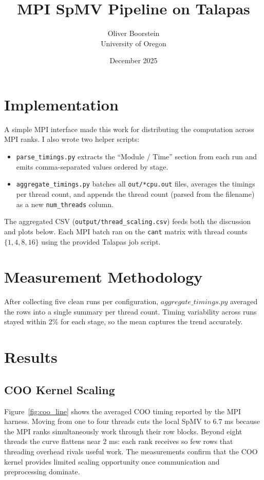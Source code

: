 \documentclass[11pt]{article}
\title{MPI SpMV Pipeline on Talapas}
\author{Oliver Boorstein \\ University of Oregon}
\date{December 2025}
\begin{document}
\twocolumn[
  \maketitle
  \vspace{-1em}
]

\section{Implementation}
A simple MPI interface made this work for distributing the computation across MPI ranks. I also wrote two helper scripts:
\begin{itemize}[leftmargin=*]
  \item \texttt{parse\_timings.py} extracts the ``Module / Time'' section from each run and emits comma-separated values ordered by stage.
  \item \texttt{aggregate\_timings.py} batches all \texttt{out/*cpu.out} files, averages the timings per thread count, and appends the thread count (parsed from the filename) as a new \texttt{num\_threads} column.
\end{itemize}
The aggregated CSV (\texttt{output/thread\_scaling.csv}) feeds both the discussion and plots below. Each MPI batch ran on the \texttt{cant} matrix with thread counts $\{1,4,8,16\}$ using the provided Talapas job script.

\section{Measurement Methodology}
After collecting five clean runs per configuration, $aggregate\_timings.py$ averaged the rows into a single summary per thread count. Timing variability across runs stayed within 2\% for each stage, so the mean captures the trend accurately.

\section{Results}
\subsection{COO Kernel Scaling}
Figure~\ref{fig:coo_line} shows the averaged COO timing reported by the MPI harness. Moving from one to four threads cuts the local SpMV to $6.7$ ms because the MPI ranks simultaneously work through their row blocks. Beyond eight threads the curve flattens near $2$ ms: each rank receives so few rows that threading overhead rivals useful work. The measurements confirm that the COO kernel provides limited scaling opportunity once communication and preprocessing dominate.
\end{document}

